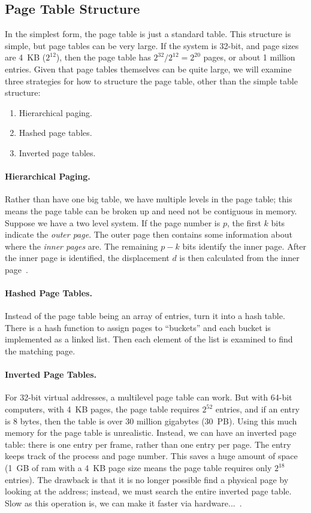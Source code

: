 \subsection*{Page Table Structure}
In the simplest form, the page table is just a standard table. This structure is simple, but page tables can be very large. If the system is 32-bit, and page sizes are 4~KB ($2^{12}$), then the page table has $2^{32}/2^{12} = 2^{20}$ pages, or about 1 million entries. Given that page tables themselves can be quite large, we will examine three strategies for how to structure the page table, other than the simple table structure:

\begin{enumerate}
	\item Hierarchical paging.
	\item Hashed page tables.
	\item Inverted page tables.
\end{enumerate}

\paragraph{Hierarchical Paging.}
Rather than have one big table, we have multiple levels in the page table; this means the page table can be broken up and need not be contiguous in memory. Suppose we have a two level system. If the page number is $p$, the first $k$ bits indicate the \textit{outer page}. The outer page then contains some information about where the \textit{inner pages} are. The remaining $p-k$ bits identify the inner page. After the inner page is identified, the displacement $d$ is then calculated from the inner page~\cite{osc}.

\paragraph{Hashed Page Tables.} 
Instead of the page table being an array of entries, turn it into a hash table. There is a hash function to assign pages to ``buckets'' and each bucket is implemented as a linked list. Then each element of the list is examined to find the matching page.

\paragraph{Inverted Page Tables.} 
For 32-bit virtual addresses, a multilevel page table can work. But with 64-bit computers, with 4~KB pages, the page table requires $2^{52}$ entries, and if an entry is 8 bytes, then the table is over 30 million gigabytes (30~PB). Using this much memory for the page table is unrealistic. Instead, we can have an inverted page table: there is one entry per frame, rather than one entry per page. The entry keeps track of the process and page number. This saves a huge amount of space (1~GB of ram with a 4~KB page size means the page table requires only $2^{18}$ entries). The drawback is that it is no longer possible find a physical page by looking at the address; instead, we must search the entire inverted page table. Slow as this operation is, we can make it faster via hardware...~\cite{mos}.

